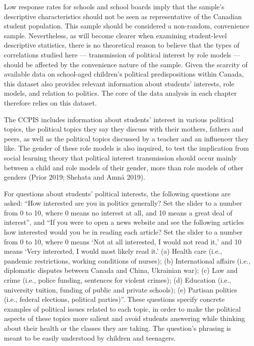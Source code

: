 \documentclass[
  letterpaper,
  DIV=11,
  numbers=noendperiod]{scrreprt}
\begin{document}
Low response rates for schools and school boards imply that the sample's
descriptive characteristics should not be seen as representative of the
Canadian student population. This sample should be considered a
non-random, convenience sample. Nevertheless, as will become clearer
when examining student-level descriptive statistics, there is no
theoretical reason to believe that the types of correlations studied
here --- transmission of political interest by role models --- should be
affected by the convenience nature of the sample. Given the scarcity of
available data on school-aged children's political predispositions
within Canada, this dataset also provides relevant information about
students' interests, role models, and relation to politics. The core of
the data analysis in each chapter therefore relies on this dataset.

The CCPIS includes information about students' interest in various
political topics, the political topics they say they discuss with their
mothers, fathers and peers, as well as the political topics discussed by
a teacher and an influencer they like. The gender of these role models
is also inquired, to test the implication from social learning theory
that political interest transmission should occur mainly between a child
and role models of their gender, more than role models of other genders
(Prior 2019; Shehata and Amnå 2019).

For questions about students' political interests, the following
questions are asked: ``How interested are you in politics generally? Set
the slider to a number from 0 to 10, where 0 means no interest at all,
and 10 means a great deal of interest'', and ``If you were to open a
news website and see the following articles how interested would you be
in reading each article? Set the slider to a number from 0 to 10, where
0 means `Not at all interested, I would not read it,' and 10 means `Very
interested, I would most likely read it.' (a) Health care (i.e.,
pandemic restrictions, working conditions of nurses); (b) International
affairs (i.e., diplomatic disputes between Canada and China, Ukrainian
war); (c) Law and crime (i.e., police funding, sentences for violent
crimes); (d) Education (i.e., university tuition, funding of public and
private schools); (e) Partisan politics (i.e., federal elections,
political parties)''. These questions specify concrete examples of
political issues related to each topic, in order to make the political
aspects of these topics more salient and avoid students answering while
thinking about their health or the classes they are taking. The
question's phrasing is meant to be easily understood by children and
teenagers.
\end{document}
